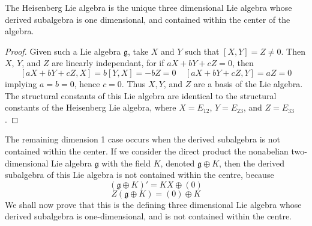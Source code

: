 \begin{theorem}
    The Heisenberg Lie algebra is the unique three dimensional Lie algebra whose derived subalgebra is one dimensional, and contained within the center of the algebra.
\end{theorem}
\begin{proof}
    Given such a Lie algebra $\mathfrak{g}$, take $X$ and $Y$ such that $[X,Y] = Z \neq 0$. Then $X$, $Y$, and $Z$ are linearly independant, for if $aX + bY + cZ = 0$, then
    \[ [aX + bY + cZ, X] = b[Y,X] = -bZ = 0\ \ \ \ \ [aX + bY + cZ, Y] = aZ = 0 \]
    implying $a = b = 0$, hence $c = 0$. Thus $X,Y$, and $Z$ are a basis of the Lie algebra. The structural constants of this Lie algebra are identical to the structural constants of the Heisenberg Lie algebra, where $X = E_{12}$, $Y = E_{23}$, and $Z = E_{33}$.
\end{proof}

The remaining dimension 1 case occurs when the derived subalgebra is not contained within the center. If we consider the direct product the nonabelian two-dimensional Lie algebra $\mathfrak{g}$ with the field $K$, denoted $\mathfrak{g} \oplus K$, then the derived subalgebra of this Lie algebra is not contained within the centre, because
%
\[ (\mathfrak{g} \oplus K)' = KX \oplus (0) \]
\[ Z(\mathfrak{g} \oplus K) = (0) \oplus K \]
%
We shall now prove that this is the defining three dimensional Lie algebra whose derived subalgebra is one-dimensional, and is not contained within the centre.

